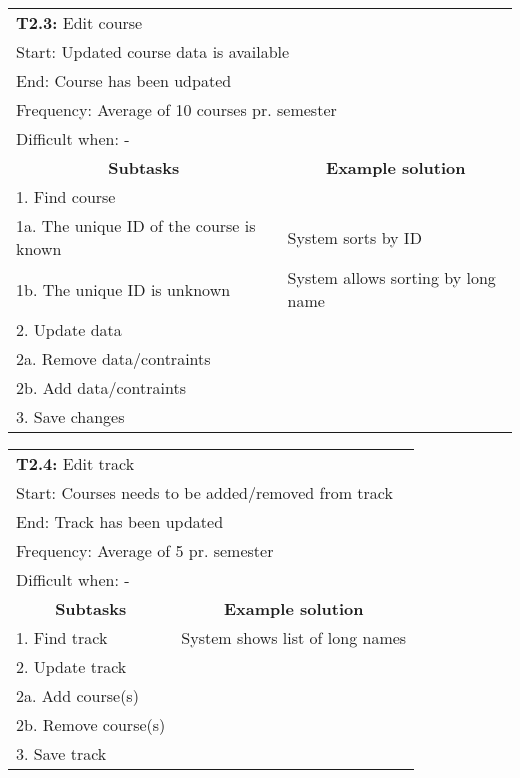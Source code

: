 \newline
\vspace{1cm}
\newline
\begin{tabular}{|p{6cm}|p{6cm}|}
\hline 
	\multicolumn{2}{|l|}{\textbf{T2.3:} \hspace{26mm}Edit course} \\
	\multicolumn{2}{|l|}{Start: \hspace{26mm}Updated course data is available} \\
	\multicolumn{2}{|l|}{End: \hspace{28mm}Course has been udpated} \\
	\multicolumn{2}{|l|}{Frequency: \hspace{17mm}Average of 10 courses pr. semester} \\
	\multicolumn{2}{|l|}{Difficult when: \hspace{10mm} - } \\ \hline
	\multicolumn{1}{|c|}{\textbf{Subtasks}} & \multicolumn{1}{c|}{\textbf{Example solution}} \\ \hline
	1.  Find course & \\
	1a. The unique ID of the course is known & System sorts by ID\\
	1b. The unique ID is unknown & System allows sorting by long name\\ \hline
	2.  Update data & \\ 
	2a. Remove data/contraints & \\
	2b. Add data/contraints & \\\hline
	3.  Save changes & \\ \hline
\end{tabular}
\newline
\vspace{1cm}
\newline
\begin{tabular}{|p{6cm}|p{6cm}|}
\hline 
	\multicolumn{2}{|l|}{\textbf{T2.4:} \hspace{26mm}Edit track} \\
	\multicolumn{2}{|l|}{Start: \hspace{26mm}Courses needs to be added/removed from track} \\
	\multicolumn{2}{|l|}{End: \hspace{28mm}Track has been updated} \\
	\multicolumn{2}{|l|}{Frequency: \hspace{17mm}Average of 5 pr. semester} \\
	\multicolumn{2}{|l|}{Difficult when: \hspace{10mm} - } \\ \hline
	\multicolumn{1}{|c|}{\textbf{Subtasks}} & \multicolumn{1}{c|}{\textbf{Example solution}} \\ \hline
	1.  Find track & System shows list of long names\\ \hline
	2.  Update track & \\ 
	2a. Add course(s) & \\
	2b. Remove course(s) & \\\hline
	3.  Save track & \\ \hline
\end{tabular}
